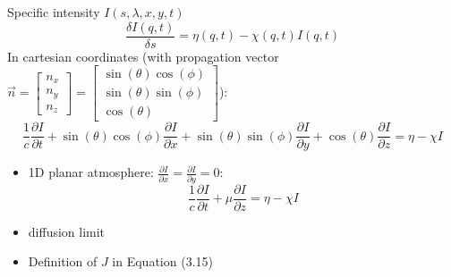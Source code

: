 \documentclass[../main/main.tex]{subfiles}
\begin{document}
Specific intensity $I(s,\lambda,x,y,t)$ 
\begin{equation}
\frac{\delta I(q,t)}{\delta s} = \eta (q,t) - \chi(q,t) I(q,t)
\end{equation}
In cartesian coordinates (with propagation vector $\vec{n} = \left[ \begin{matrix} n_x \\ n_y \\ n_z \end{matrix}  \right]  = \left[ \begin{matrix} \sin(\theta) \cos(\phi) \\ \sin(\theta) \sin(\phi)  \\ \cos(\theta) \end{matrix}  \right]$):
\begin{equation}
\frac{1}{c}\frac{\partial I}{\partial t} + \sin(\theta)\cos(\phi)\frac{\partial I}{\partial x} + \sin(\theta)\sin(\phi)\frac{\partial I}{\partial y} + \cos(\theta) \frac{\partial I}{\partial z} = \eta - \chi I
\end{equation}
\begin{itemize}
\item 1D planar atmosphere: $\frac{\partial I}{\partial x} = \frac{\partial I}{\partial y} = 0$:
\begin{equation}
\frac{1}{c} \frac{\partial I}{\partial t} + \mu \frac{\partial I}{\partial z} = \eta - \chi I
\end{equation}

\item diffusion limit
\item Definition of $J$ in Equation (3.15)
\end{itemize}
\end{document}
